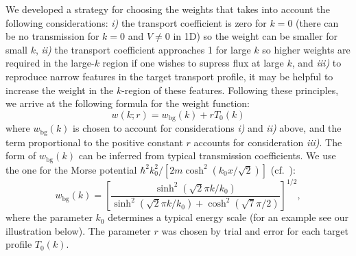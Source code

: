 \documentclass[twocolumn,amsmath,amssymb,showpacs,prl,superscriptaddress,aps]{revtex4-1}
\begin{document}
We developed a strategy for choosing the weights that takes into account the following considerations: {\it i)} the transport coefficient is zero for $k=0$ 
(there can be no transmission for $k=0$ and $V\neq 0$ in 1D) so the weight can be smaller for small $k$, {\it ii)} the transport coefficient approaches 1 for large $k$ so higher weights are required in the large-$k$ region if one wishes to supress flux at large $k$, and {\it iii)} to reproduce narrow features in the target transport profile, it may be helpful to increase the weight in the $k$-region of these features. Following these principles, we arrive at the following formula for the weight function:
\begin{equation}\label{eq:weight-of-k}
  w(k;r) = w_{\mathrm{bg}}(k) + rT_0(k)
\end{equation}
where $w_{\mathrm{bg}}(k)$ is chosen to account for considerations {\it i)} and {\it ii)} above, and the term proportional to the positive constant $r$ accounts for consideration {\it iii)}. {\color{blue} The form  of $w_{\mathrm{bg}}(k)$ can be inferred from typical transmission coefficients. We use the one for 
the Morse potential $\hbar^2k_0^2/[2m \cosh^2(k_0x/\sqrt{2})]$ (cf.~\cite{landau1977}):
\begin{equation}\label{eq:weight-of-k}
  w_{\mathrm{bg}}(k) = \left[\frac{\sinh^2(\sqrt{2}\pi k/k_0)}{\sinh^2(\sqrt{2}\pi k/k_0) + \cosh^2(\sqrt{7}\pi/2)}\right]^{1/2},
\end{equation}
where the parameter $k_0$ determines a typical energy scale (for an example see our illustration below).}
The parameter $r$ was chosen by trial and error for each target profile $T_0(k)$.
\end{document}
